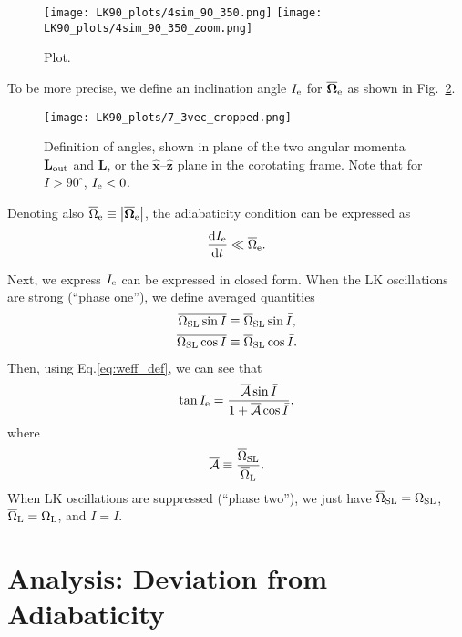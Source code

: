 \documentclass[
        fleqn,
        usenatbib,
    ]{mnras}
\newcommand*{\rd}[2]{\frac{\mathrm{d}#1}{\mathrm{d}#2}}
\newcommand*{\abs}[1]{\left|#1\right|}
\newcommand*{\bm}[1]{\boldsymbol{\mathbf{#1}}}
\newcommand*{\uv}[1]{\hat{\bm{#1}}}
\begin{document}
\begin{figure}
    \centering
    \texttt{[image: LK90\_plots/4sim\_90\_350.png]}
    \texttt{[image: LK90\_plots/4sim\_90\_350\_zoom.png]}
    \caption{Plot.}\label{fig:4sim_90_350}
\end{figure}

To be more precise, we define an inclination angle $I_{\rm e}$ for
$\bm{\overline{\Omega}}_{\rm e}$ as shown in Fig.~\ref{fig:3vec}.
\begin{figure}
    \centering
    \texttt{[image: LK90\_plots/7\_3vec\_cropped.png]}
    \caption{Definition of angles, shown in plane of the two angular momenta
    $\bm{L}_{\rm out}$ and $\bm{L}$, or the $\uv{x}$--$\uv{z}$ plane in the
    corotating frame. Note that for $I > 90^\circ$, $I_{\rm e} <
    0$.}\label{fig:3vec}
\end{figure}
Denoting also $\overline{\Omega}_{\rm e} \equiv \abs{\bm{\overline{\Omega}}_{\rm
e}}$, the adiabaticity condition can be expressed as
\begin{equation}
    \rd{I_{\rm e}}{t} \ll \overline{\Omega}_{\rm e}.\label{eq:ad_constr_idot}
\end{equation}

Next, we express $I_{\rm e}$ can be expressed in closed form. When the LK
oscillations are strong (``phase one''), we define averaged quantities
\begin{align}
    \overline{\Omega_{\rm SL} \sin I} &\equiv
            \overline{\Omega}_{\rm SL} \sin \bar{I},\\
    \overline{\Omega_{\rm SL} \cos I} &\equiv
            \overline{\Omega}_{\rm SL} \cos \bar{I}.
\end{align}
Then, using Eq.\eqref{eq:weff_def}, we can see that
\begin{equation}
    \tan I_{\rm e} = \frac{\overline{\mathcal{A}}\sin \bar{I}}{
        1 + \overline{\mathcal{A}}\cos \bar{I}},\label{eq:ie_def}
\end{equation}
where
\begin{equation}
    \overline{\mathcal{A}} \equiv \frac{\overline{\Omega}_{\rm SL}}{
        \overline{\Omega}_{\rm L}}.
\end{equation}
When LK oscillations are suppressed (``phase two''), we just have
$\overline{\Omega}_{\rm SL} = \Omega_{\rm SL}$, $\overline{\Omega}_{\rm L} =
\Omega_{\rm L}$, and $\bar{I} = I$.

\section{Analysis: Deviation from Adiabaticity}
\end{document}
